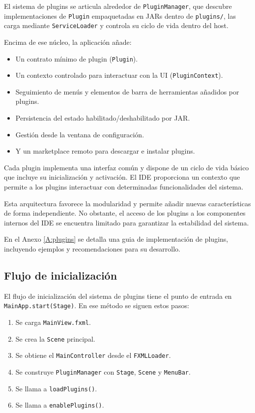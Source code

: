 \documentclass[../../main.tex]{subfiles}
\begin{document}
El sistema de plugins se articula alrededor de \lstinline|PluginManager|, que descubre implementaciones de \lstinline|Plugin| empaquetadas en JARs dentro de \lstinline|plugins/|, las carga mediante \lstinline|ServiceLoader| y controla su ciclo de vida dentro del host.

\clearpage 

Encima de ese núcleo, la aplicación añade:

\begin{itemize}
    \item Un contrato mínimo de plugin (\lstinline|Plugin|).
    \item Un contexto controlado para interactuar con la UI (\lstinline|PluginContext|).
    \item Seguimiento de menús y elementos de barra de herramientas añadidos por plugins.
    \item Persistencia del estado habilitado/deshabilitado por JAR.
    \item Gestión desde la ventana de configuración.
    \item Y un marketplace remoto para descargar e instalar plugins.
\end{itemize}

Cada plugin implementa una interfaz común y dispone de un ciclo de vida básico que incluye su inicialización y activación. El IDE proporciona un contexto que permite a los plugins interactuar con determinadas funcionalidades del sistema.

Esta arquitectura favorece la modularidad y permite añadir nuevas características de forma independiente. No obstante, el acceso de los plugins a los componentes internos del IDE se encuentra limitado para garantizar la estabilidad del sistema.

En el Anexo \ref{A:plugins} se detalla una guia de implementación de plugins, incluyendo ejemplos y recomendaciones para su desarrollo.


\subsection{Flujo de inicialización}

El flujo de inicialización del sistema de plugins tiene el punto de entrada en \lstinline|MainApp.start(Stage)|. En ese método se siguen estos pasos:

\begin{enumerate}
    \item Se carga \lstinline|MainView.fxml|.
    \item Se crea la \lstinline|Scene| principal.
    \item Se obtiene el \lstinline|MainController| desde el \lstinline|FXMLLoader|.
    \item Se construye \lstinline|PluginManager| con \lstinline|Stage|, \lstinline|Scene| y \lstinline|MenuBar|.
    \item Se llama a \lstinline|loadPlugins()|.
    \item Se llama a \lstinline|enablePlugins()|.
\end{enumerate}
\end{document}
